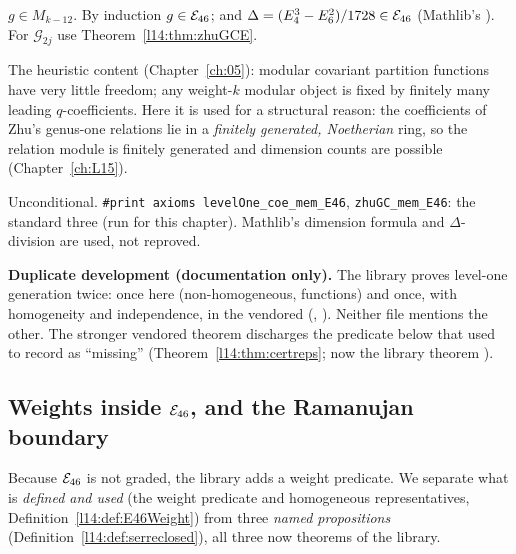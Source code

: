 $g\in M_{k-12}$. By induction $g\in\mathcal{E}_{46}$; and $\Delta = (E_4^3-E_6^2)/1728\in\mathcal{E}_{46}$ (Mathlib's
). For $\mathcal G_{2j}$ use Theorem~\ref{l14:thm:zhuGCE}.
\begin{physics}
The heuristic content (Chapter~\ref{ch:05}): modular covariant partition functions have very little freedom; any weight-$k$
modular object is fixed by finitely many leading $q$-coefficients. Here it is used for a structural reason: the
coefficients of Zhu's genus-one relations lie in a \emph{finitely generated, Noetherian} ring, so the relation module is
finitely generated and dimension counts are possible (Chapter~\ref{ch:L15}).
\end{physics}
\begin{status}
Unconditional. \texttt{\#print axioms levelOne\_coe\_mem\_E46}, \texttt{zhuGC\_mem\_E46}: the standard three (run for this
chapter). Mathlib's dimension formula and $\Delta$-division are used, not reproved.
\end{status}

\begin{warning}
\textbf{Duplicate development (documentation only).} The library proves level-one generation twice: once here (non-homogeneous, functions)
and once, with homogeneity and independence, in the vendored 
(, ). Neither file mentions the other. The stronger vendored theorem
discharges the predicate below that  used to record as ``missing''
(Theorem~\ref{l14:thm:certreps}; now the library theorem ).
\end{warning}

\subsection{Weights inside \texorpdfstring{$\mathcal{E}_{46}$}{E46}, and the Ramanujan boundary}\label{l14:sec:ramanujan}

Because $\mathcal{E}_{46}$ is not graded, the library adds a weight predicate. We separate what is \emph{defined and used} (the
weight predicate and homogeneous representatives, Definition~\ref{l14:def:E46Weight}) from three \emph{named propositions}
(Definition~\ref{l14:def:serreclosed}), all three now theorems of the library.

